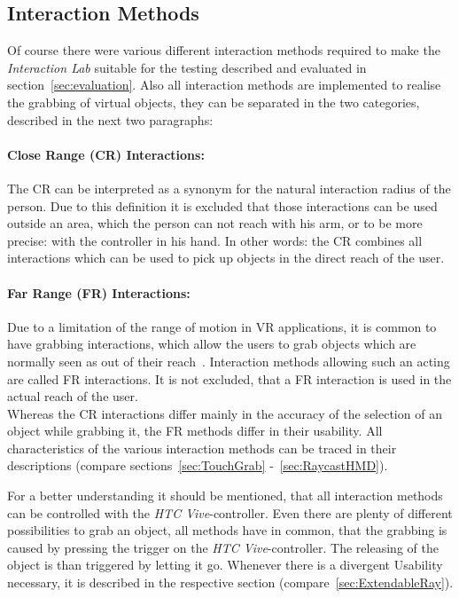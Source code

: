 \subsection{Interaction Methods}\label{sec:Interactions}
Of course there were various different interaction methods required to make the \textit{Interaction Lab} suitable for the testing described and evaluated in section~\ref{sec:evaluation}. Also all interaction methods are implemented to realise the grabbing of virtual objects, they can be separated in the two categories, described in the next two paragraphs:

\paragraph{Close Range (CR) Interactions:} The CR can be interpreted as a synonym for the natural interaction radius of the person. Due to this definition it is excluded that those interactions can be used outside an area, which the person can not reach with his arm, or to be more precise: with the controller in his hand. In other words: the CR combines all interactions which can be used to pick up objects in the direct reach of the user.

\paragraph{Far Range (FR) Interactions:} Due to a limitation of the range of motion in VR applications, it is common to have grabbing interactions, which allow the users to grab objects which are normally seen as out of their reach~\cite{VRBook}. Interaction methods allowing such an acting are called FR interactions. It is not excluded, that a FR interaction is used in the actual reach of the user. \\

Whereas the CR interactions differ mainly in the accuracy of the selection of an object while grabbing it, the FR methods differ in their usability. All characteristics of the various interaction methods can be traced in their descriptions (compare sections~\ref{sec:TouchGrab} -~\ref{sec:RaycastHMD}).

For a better understanding it should be mentioned, that all interaction methods can be controlled with the \textit{HTC Vive}-controller. Even there are plenty of different possibilities to grab an object, all methods have in common, that the grabbing is caused by pressing the trigger on the \textit{HTC Vive}-controller. The releasing of the object is than triggered by letting it go. Whenever there is a divergent Usability necessary, it is described in the respective section (compare~\ref{sec:ExtendableRay}).

